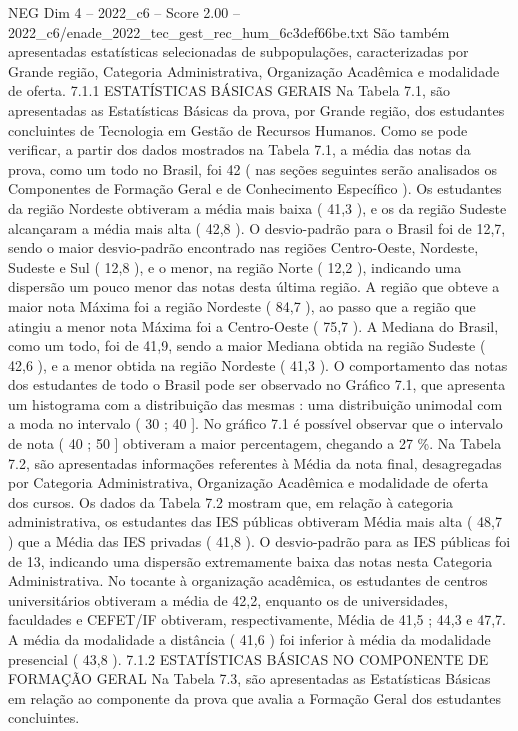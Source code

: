 \begin{textsample}{NEG Dim 4 – 2022\_c6 – Score 2.00 – 2022\_c6/enade\_2022\_tec\_gest\_rec\_hum\_6c3def66be.txt}
São também apresentadas estatísticas selecionadas de subpopulações, caracterizadas por Grande região, Categoria Administrativa, Organização Acadêmica e modalidade de oferta. 7.1.1 ESTATÍSTICAS BÁSICAS GERAIS Na Tabela 7.1, são apresentadas as Estatísticas Básicas da prova, por Grande região, dos estudantes concluintes de Tecnologia em Gestão de Recursos Humanos.
Como se pode verificar, a partir dos dados mostrados na Tabela 7.1, a média das notas da prova, como um todo no Brasil, foi 42 ( nas seções seguintes serão analisados os Componentes de Formação Geral e de Conhecimento Específico ).
Os estudantes da região Nordeste obtiveram a média mais baixa ( 41,3 ), e os da região Sudeste alcançaram a média mais alta ( 42,8 ).
O desvio-padrão para o Brasil foi de 12,7, sendo o maior desvio-padrão encontrado nas regiões Centro-Oeste, Nordeste, Sudeste e Sul ( 12,8 ), e o menor, na região Norte ( 12,2 ), indicando uma dispersão um pouco menor das notas desta última região.
A região que obteve a maior nota Máxima foi a região Nordeste ( 84,7 ), ao passo que a região que atingiu a menor nota Máxima foi a Centro-Oeste ( 75,7 ).
A Mediana do Brasil, como um todo, foi de 41,9, sendo a maior Mediana obtida na região Sudeste ( 42,6 ), e a menor obtida na região Nordeste ( 41,3 ).
O comportamento das notas dos estudantes de todo o Brasil pode ser observado no Gráfico 7.1, que apresenta um histograma com a distribuição das mesmas : uma distribuição unimodal com a moda no intervalo ( 30 ; 40 ].
No gráfico 7.1 é possível observar que o intervalo de nota ( 40 ; 50 ] obtiveram a maior percentagem, chegando a 27 \%.
Na Tabela 7.2, são apresentadas informações referentes à Média da nota final, desagregadas por Categoria Administrativa, Organização Acadêmica e modalidade de oferta dos cursos.
Os dados da Tabela 7.2 mostram que, em relação à categoria administrativa, os estudantes das IES públicas obtiveram Média mais alta ( 48,7 ) que a Média das IES privadas ( 41,8 ).
O desvio-padrão para as IES públicas foi de 13, indicando uma dispersão extremamente baixa das notas nesta Categoria Administrativa.
No tocante à organização acadêmica, os estudantes de centros universitários obtiveram a média de 42,2, enquanto os de universidades, faculdades e CEFET/IF obtiveram, respectivamente, Média de 41,5 ; 44,3 e 47,7.
A média da modalidade a distância ( 41,6 ) foi inferior à média da modalidade presencial ( 43,8 ). 7.1.2 ESTATÍSTICAS BÁSICAS NO COMPONENTE DE FORMAÇÃO GERAL Na Tabela 7.3, são apresentadas as Estatísticas Básicas em relação ao componente da prova que avalia a Formação Geral dos estudantes concluintes.

\end{textsample}
